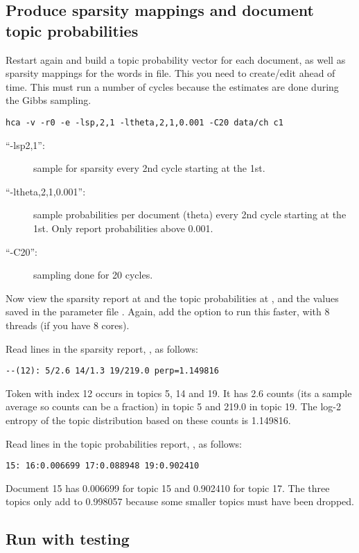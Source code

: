\documentclass[a4paper,english]{article}
\begin{document}
\subsection{Produce sparsity mappings and document topic probabilities}
Restart again and build a topic probability vector for each document,
as well as sparsity mappings for the words in 
 file.
This you need to create/edit ahead of time.
This must run a number of cycles because the estimates are done 
during the Gibbs sampling.
\begin{verbatim}
hca -v -r0 -e -lsp,2,1 -ltheta,2,1,0.001 -C20 data/ch c1
\end{verbatim} 
\begin{description}
\item[``-lsp2,1'':] sample for sparsity every 2nd cycle
starting at the 1st.
\item[``-ltheta,2,1,0.001'':] sample probabilities per document
(theta) every 2nd cycle
starting at the 1st.
Only report probabilities above 0.001.
\item[``-C20'':] sampling done for 20 cycles.
\end{description}
Now view the sparsity report at  and
the topic probabilities at ,
and the values saved in the parameter file .
Again, add the  option to run this faster,
with 8 threads (if you have 8 cores).

Read lines in the sparsity report, , as follows:
\begin{verbatim}
--(12): 5/2.6 14/1.3 19/219.0 perp=1.149816
\end{verbatim} 
Token with index 12 occurs in topics 5, 14 and 19.
It has 2.6 counts (its a sample average so counts can be a fraction)
in topic 5 and 219.0 in topic 19.
The log-2 entropy of the topic distribution based on these
counts is 1.149816.

Read lines in the topic probabilities report, , as follows:
\begin{verbatim}
15: 16:0.006699 17:0.088948 19:0.902410
\end{verbatim} 
Document 15 has 0.006699 for topic 15 and 0.902410 for topic 17.
The three topics only add to 0.998057 because some
smaller topics must have been dropped.

\subsection{Run with testing}
\end{document}
